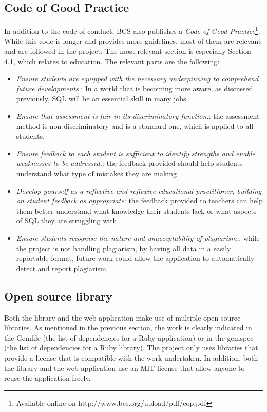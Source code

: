 \subsection{Code of Good Practice}

In addition to the code of conduct, BCS also publishes a \textit{Code of Good Practice}\footnote{Available online on http://www.bcs.org/upload/pdf/cop.pdf}. While this code is longer and provides more guidelines, most of them are relevant and are followed in the project. The most relevant section is especially Section 4.1, which relates to education. The relevant parts are the following:

\begin{itemize}
    \item \textit{Ensure students are equipped with the necessary underpinning to comprehend future developments.}: In a world that is becoming more aware, as discussed previously, SQL will be an essential skill in many jobs.
    \item \textit{Ensure that assessment is fair in its discriminatory function.}: the assessment method is non-discriminatory and is a standard one, which is applied to all students.
    \item \textit{Ensure feedback to each student is sufficient to identify strengths and enable weaknesses to be addressed.}: the feedback provided should help students understand what type of mistakes they are making
    \item \textit{Develop yourself as a reflective and reflexive educational practitioner, building on student feedback as appropriate}: the feedback provided to teachers can help them better understand what knowledge their students lack or what aspects of SQL they are struggling with.
    \item \textit{Ensure students recognise the nature and unacceptability of plagiarism.}: while the project is not handling plagiarism, by having all data in a easily reportable format, future work could allow the application to automatically detect and report plagiarism.
\end{itemize}

\subsection{Open source library}

Both the library and the web application make use of multiple open source libraries. As mentioned in the previous section, the work is clearly indicated in the Gemfile (the list of dependencies for a Ruby application) or in the gemspec (the list of dependencies for a Ruby library). The project only uses libraries that provide a license that is compatible with the work undertaken. In addition, both the library and the web application use an MIT license that allow anyone to reuse the application freely.
